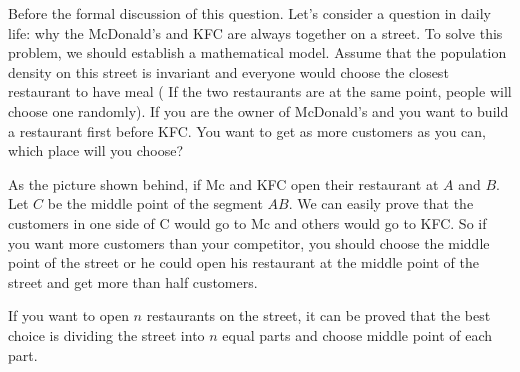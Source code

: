Before the formal discussion of this question. Let's consider a 
question in daily life: why the McDonald's and KFC are always together
on a street. To solve this problem, we should establish a mathematical
model. Assume that the population density on this street is invariant
and everyone would choose the closest restaurant to have meal ( If the
two restaurants are at the same point, people will choose one
randomly). If you are the owner of McDonald's and you want to build
a restaurant first before KFC. You want to get as more customers
as you can, which place will you choose?
	
As the picture shown behind, if Mc and KFC open their restaurant at $A$
and $B$. Let $C$ be the middle point of the segment $AB$. We can easily
prove that the customers in one side of C would go to Mc and others
would go to KFC. So if you want more customers than your competitor,
you should choose the middle point of the street or he could open his
restaurant at the middle point of the street and get more than half customers.
	
\begin{center}
\end{center}
	
If you want to open $n$ restaurants on the street, it can be proved that
the best choice is dividing the street into $n$ equal parts and choose
middle point of each part.
	
